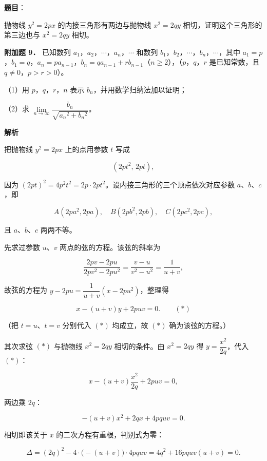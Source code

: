 \begin{answer}

\textbf{题目}：

抛物线 $y^2=2px$ 的内接三角形有两边与抛物线 $x^2=2qy$ 相切，证明这个三角形的第三边也与 $x^2=2qy$ 相切。

\textbf{附加题 9．} 已知数列 $a_1$，$a_2$，$\cdots$，$a_n$，$\cdots$ 和数列 $b_1$，$b_2$，$\cdots$，$b_n$，$\cdots$，其中 $a_1=p$，$b_1=q$，$a_n=pa_{n-1}$，$b_n=qa_{n-1}+rb_{n-1}$（$n\geqslant2$），（$p$，$q$，$r$ 是已知常数，且 $q\ne0$，$p>r>0$）。

（1）用 $p$，$q$，$r$，$n$ 表示 $b_n$，并用数学归纳法加以证明；

（2）求 $\lim\limits_{n\to\infty}\dfrac{b_n}{\sqrt{a_n{}^2+b_n{}^2}}$。

\textbf{解析}

把抛物线 $y^2=2px$ 上的点用参数 $t$ 写成

\nopagebreak[4]
\[
(2pt^2,\,2pt),
\]

因为 $(2pt)^2=4p^2t^2=2p\cdot2pt^2$。设内接三角形的三个顶点依次对应参数 $a$、$b$、$c$，即

\nopagebreak[4]
\[
A(2pa^2,2pa),\quad B(2pb^2,2pb),\quad C(2pc^2,2pc),
\]

且 $a$、$b$、$c$ 两两不等。

先求过参数 $u$、$v$ 两点的弦的方程。该弦的斜率为

\nopagebreak[4]
\[
\frac{2pv-2pu}{2pv^2-2pu^2}=\frac{v-u}{v^2-u^2}=\frac1{u+v},
\]

故弦的方程为 $y-2pu=\dfrac1{u+v}(x-2pu^2)$，整理得

\nopagebreak[4]
\[
x-(u+v)y+2puv=0. \qquad (\ast)
\]

（把 $t=u$、$t=v$ 分别代入 $(\ast)$ 均成立，故 $(\ast)$ 确为该弦的方程。）

其次求弦 $(\ast)$ 与抛物线 $x^2=2qy$ 相切的条件。由 $x^2=2qy$ 得 $y=\dfrac{x^2}{2q}$，代入 $(\ast)$：

\nopagebreak[4]
\[
x-(u+v)\frac{x^2}{2q}+2puv=0,
\]

两边乘 $2q$：

\nopagebreak[4]
\[
-(u+v)x^2+2qx+4pquv=0.
\]

相切即该关于 $x$ 的二次方程有重根，判别式为零：

\nopagebreak[4]
\[
\Delta=(2q)^2-4\cdot\bigl(-(u+v)\bigr)\cdot4pquv=4q^2+16pquv(u+v)=0.
\]


\end{answer}
